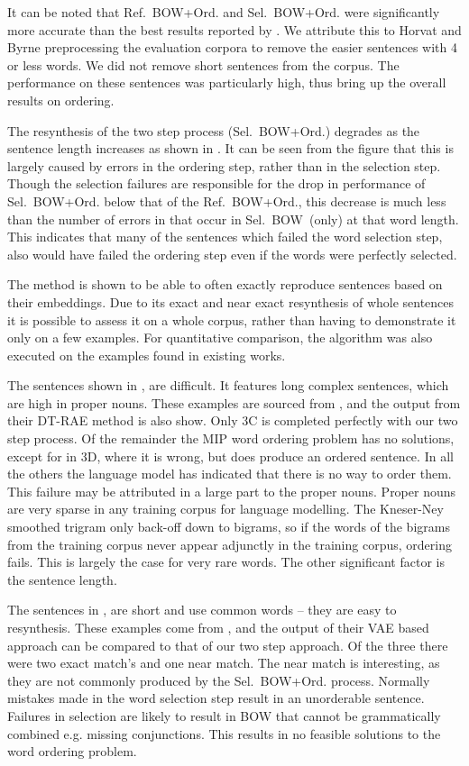 \documentclass[11pt]{article}
\theoremstyle{plain}
\theoremstyle{definition}
\newcommand{\textcite}{\protect\newcite}
\newcommand{\oracletitle}{Ref.~BOW+Ord.}
\newcommand{\selectiontitle}{Sel.~BOW~(only)}
\newcommand{\twosteptitle}{Sel.~BOW+Ord.}
\begin{document}
It can be noted that \oracletitle{} and \twosteptitle{} were significantly more accurate than the best results reported by \textcite{Horvat2014}. We attribute this to Horvat and Byrne preprocessing the evaluation corpora to remove the easier sentences with 4 or less words. We did not remove short sentences from the corpus. The performance on these sentences was particularly high, thus bring up the overall results on ordering.

The resynthesis of the two step process (\twosteptitle{}) degrades as the sentence length increases as shown in . It can be seen from the figure that this is largely caused by errors in the ordering step, rather than in the selection step. Though the selection failures are responsible for the drop in performance of \twosteptitle{} below that of the \oracletitle{}, this decrease is much less than the number of errors in that occur in \selectiontitle{} at that word length. This indicates that many of the sentences which failed the word selection step, also would have failed the ordering step even if the words were perfectly selected.


The method is shown to be able to often exactly reproduce sentences based on their embeddings.  Due to its exact and near exact resynthesis of whole sentences it is possible to assess it on a whole corpus, rather than having to demonstrate it only on a few examples. For quantitative comparison, the algorithm was also executed on the examples found in existing works.

The sentences shown in , are difficult. It features long complex sentences, which are high in proper nouns. These examples are sourced from \textcite{iyyer2014generating}, and the output from their DT-RAE method is also show. Only 3C is completed perfectly with our two step process. Of the remainder the MIP word ordering problem has no solutions, except for in 3D, where it is wrong, but does produce an ordered sentence. In all the others the language model has indicated that there is no way to order them. This failure may be attributed in a large part to the proper nouns.  Proper nouns are very sparse in any training corpus for language modelling. The Kneser-Ney smoothed trigram only back-off down to bigrams, so if the words of the bigrams from the training corpus never appear adjunctly in the training corpus, ordering fails. This is largely the case for very rare words. The other significant factor is the sentence length.

The sentences in , are short and use common words -- they are easy to resynthesis. These examples come from \textcite{Bowman2015SmoothGeneration}, and the output of their VAE based approach can be compared to that of our two step approach. Of the three there were two exact match's and one near match. The near match is interesting, as they are not commonly produced by the \twosteptitle{} process. Normally mistakes made in the word selection step result in an unorderable sentence. Failures in selection are likely to result in BOW that cannot be grammatically combined e.g. missing conjunctions. This results in no feasible solutions to the word ordering problem.
\end{document}

